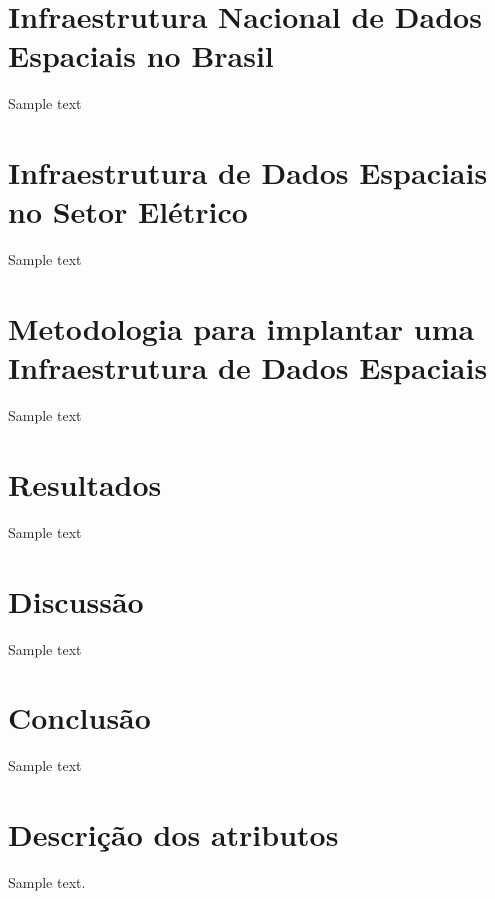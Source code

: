 \documentclass[12pt,5p]{elsarticle}
\begin{document}


\section{Infraestrutura Nacional de Dados Espaciais no Brasil}

Sample text

\section{Infraestrutura de Dados Espaciais no Setor El\'etrico}

Sample text

\section{Metodologia para implantar uma Infraestrutura de Dados Espaciais}

Sample text

\section{Resultados}

Sample text

\section{Discuss\~ao}

Sample text

\section{Conclus\~ao}

Sample text

\appendix

\section{Descri\c{c}\~ao dos atributos}
\label{appendix-sec1}

Sample text. 



%
% 
% 
% 
% 
% 
% 
% 
% 
% 
% 

% 


\end{document}
